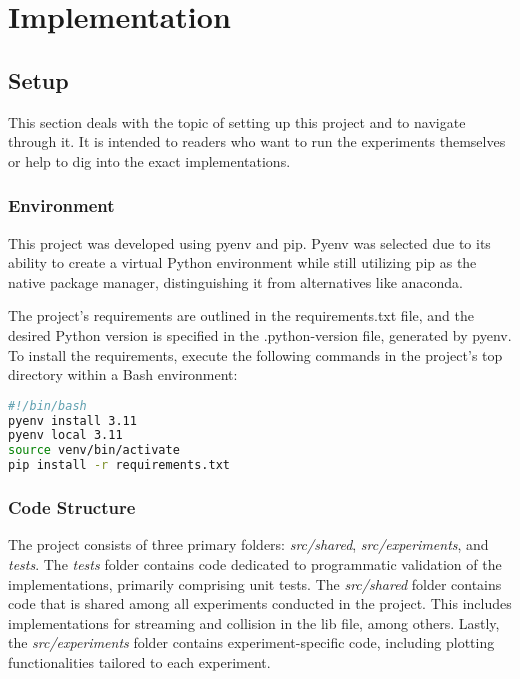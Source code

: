 \chapter{Implementation}\label{ch:implementation}


\section{Setup}
This section deals with the topic of setting up this project and to navigate through it.
It is intended to readers who want to run the experiments themselves or help to dig into the exact implementations.

\subsection{Environment}
This project was developed using pyenv and pip.
Pyenv was selected due to its ability to create a virtual Python environment while still utilizing pip as the native package manager, distinguishing it from alternatives like anaconda.
\newline

The project's requirements are outlined in the requirements.txt file, and the desired Python version is specified in the .python-version file, generated by pyenv.
To install the requirements, execute the following commands in the project's top directory within a Bash environment:

\begin{center}
    \begin{lstlisting}[language=bash]
#!/bin/bash
pyenv install 3.11
pyenv local 3.11
source venv/bin/activate
pip install -r requirements.txt
    \end{lstlisting}
\end{center}

\subsection{Code Structure}
The project consists of three primary folders: \textit{src/shared}, \textit{src/experiments}, and \textit{tests}.
The \textit{tests} folder contains code dedicated to programmatic validation of the implementations, primarily comprising unit tests.
The \textit{src/shared} folder contains code that is shared among all experiments conducted in the project.
This includes implementations for streaming and collision in the lib file, among others.
Lastly, the \textit{src/experiments} folder contains experiment-specific code, including plotting functionalities tailored to each experiment.


